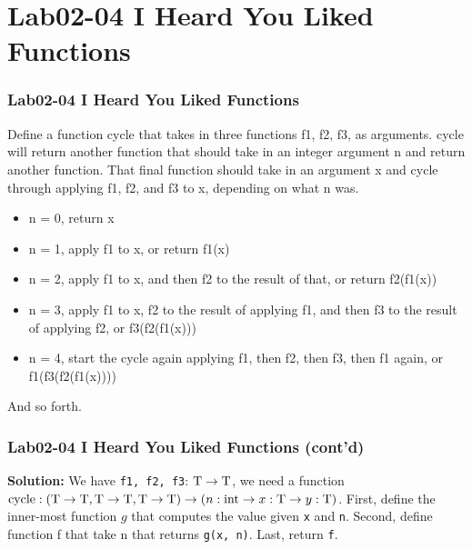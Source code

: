 \documentclass[aspectratio=169]{beamer}
\begin{document}
\section{Lab02-04 I Heard You Liked Functions}
\begin{frame}
\frametitle{Lab02-04 I Heard You Liked Functions}

\vspace{-5mm}

Define a function cycle that takes in three functions f1, f2, f3, as arguments. cycle will return another function that should take in an integer argument n and return another function. That final function should take in an argument x and cycle through applying f1, f2, and f3 to x, depending on what n was.

\begin{itemize}
    \item n = 0, return x
    \item n = 1, apply f1 to x, or return f1(x)
    \item n = 2, apply f1 to x, and then f2 to the result of that, or return f2(f1(x))
    \item n = 3, apply f1 to x, f2 to the result of applying f1, and then f3 to the result of applying f2, or f3(f2(f1(x)))
    \item n = 4, start the cycle again applying f1, then f2, then f3, then f1 again, or f1(f3(f2(f1(x))))

\end{itemize}
And so forth.

\end{frame}


\begin{frame}[fragile]
\frametitle{Lab02-04 I Heard You Liked Functions (cont'd)}

\textbf{Solution:} We have \texttt{f1, f2, f3}: ${\rm T \to T}$, we need a function ${\rm cycle}: ({\rm T\to T, T\to T, T\to T)} \to (n:{\rm int} \to x:{\rm T} \to y: {\rm T})$. First, define the inner-most function $g$ that computes the value given \texttt{x} and \texttt{n}. Second, define function f that take n that returns \texttt{g(x, n)}. Last, return \texttt{f}.


\end{frame}
\end{document}
